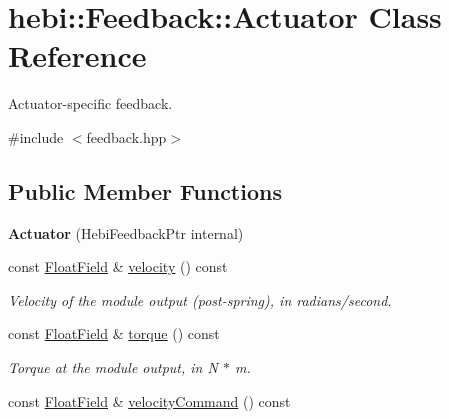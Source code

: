 \hypertarget{classhebi_1_1Feedback_1_1Actuator}{}\section{hebi\+:\+:Feedback\+:\+:Actuator Class Reference}
\label{classhebi_1_1Feedback_1_1Actuator}


Actuator-\/specific feedback.  




{\ttfamily \#include $<$feedback.\+hpp$>$}

\subsection*{Public Member Functions}
\begin{DoxyCompactItemize}
\item 
{\bfseries Actuator} (Hebi\+Feedback\+Ptr internal)\hypertarget{classhebi_1_1Feedback_1_1Actuator_a2af3d7a0d6291196a10c08fe707f0c09}{}\label{classhebi_1_1Feedback_1_1Actuator_a2af3d7a0d6291196a10c08fe707f0c09}

\item 
const \hyperlink{classhebi_1_1Feedback_1_1FloatField}{Float\+Field} \& \hyperlink{classhebi_1_1Feedback_1_1Actuator_ac416200706ceb927351f656adab77f02}{velocity} () const \hypertarget{classhebi_1_1Feedback_1_1Actuator_ac416200706ceb927351f656adab77f02}{}\label{classhebi_1_1Feedback_1_1Actuator_ac416200706ceb927351f656adab77f02}

\begin{DoxyCompactList}\small\item\em Velocity of the module output (post-\/spring), in radians/second. \end{DoxyCompactList}\item 
const \hyperlink{classhebi_1_1Feedback_1_1FloatField}{Float\+Field} \& \hyperlink{classhebi_1_1Feedback_1_1Actuator_ae16a09cf2014410cb4ffbba5367ed093}{torque} () const \hypertarget{classhebi_1_1Feedback_1_1Actuator_ae16a09cf2014410cb4ffbba5367ed093}{}\label{classhebi_1_1Feedback_1_1Actuator_ae16a09cf2014410cb4ffbba5367ed093}

\begin{DoxyCompactList}\small\item\em Torque at the module output, in N $\ast$ m. \end{DoxyCompactList}\item 
const \hyperlink{classhebi_1_1Feedback_1_1FloatField}{Float\+Field} \& \hyperlink{classhebi_1_1Feedback_1_1Actuator_a86af2dfbc603274665fdc14681c34359}{velocity\+Command} () const \hypertarget{classhebi_1_1Feedback_1_1Actuator_a86af2dfbc603274665fdc14681c34359}{}\label{classhebi_1_1Feedback_1_1Actuator_a86af2dfbc603274665fdc14681c34359}


\end{DoxyCompactItemize}
